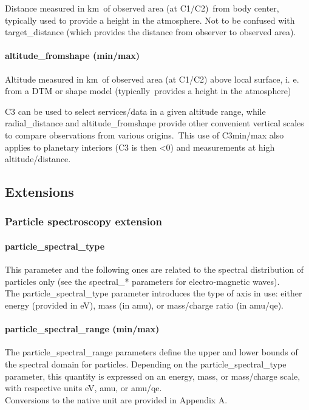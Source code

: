 \documentclass[11pt,a4paper]{ivoa}
\begin{document}
Distance measured in km of observed area (at C1/C2) from body center, typically used to provide a height in the atmosphere. Not to be confused with target\_distance (which provides the distance from observer to observed area). 

\paragraph{altitude\_fromshape (min/max)}

Altitude measured in km of observed area (at C1/C2) above local surface, i. e. from a DTM or shape model (typically provides a height in the atmosphere)

C3 can be used to select services/data in a given altitude range, while radial\_distance and altitude\_fromshape provide other convenient vertical scales to compare observations from various origins. This use of C3min/max also applies to planetary interiors (C3 is then <0) and measurements at high altitude/distance. 

\subsection{Extensions}

\subsubsection{Particle spectroscopy extension}

\paragraph{particle\_spectral\_type}

This parameter and the following ones are related to the spectral distribution of particles only (see the spectral\_* parameters for electro-magnetic waves).\\The particle\_spectral\_type parameter introduces the type of axis in use: either energy (provided in eV), mass (in amu), or mass/charge ratio (in amu/qe).

\paragraph{particle\_spectral\_range (min/max)}

The particle\_spectral\_range parameters define the upper and lower bounds of the spectral domain for particles. Depending on the particle\_spectral\_type parameter, this quantity is expressed on an energy, mass, or mass/charge scale, with respective units eV, amu, or amu/qe. \\Conversions to the native unit are provided in Appendix A.
\end{document}
